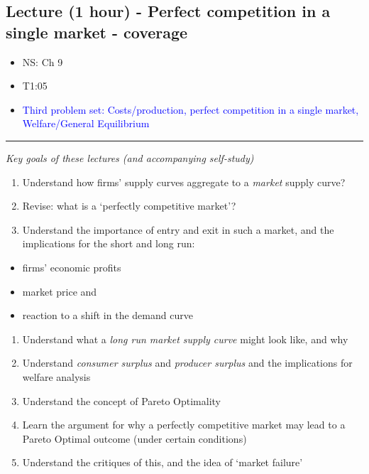 \documentclass[]{article}
\providecommand{\tightlist}{%
  \setlength{\itemsep}{0pt}\setlength{\parskip}{0pt}}
\begin{document}
\hypertarget{lecture-1-hour---perfect-competition-in-a-single-market---coverage}{%
\subsection{Lecture (1 hour) - Perfect competition in a single market -
coverage}\label{lecture-1-hour---perfect-competition-in-a-single-market---coverage}}

\begin{itemize}
\item
  NS: Ch 9
\item
  T1:05
\item
  \textcolor{blue}{Third problem set: Costs/production, perfect competition in a single market, Welfare/General Equilibrium }
\end{itemize}

\begin{center}\rule{0.5\linewidth}{\linethickness}\end{center}

\emph{Key goals of these lectures (and accompanying self-study)}

\begin{enumerate}
\def\labelenumi{\arabic{enumi}.}
\tightlist
\item
  Understand how firms' supply curves aggregate to a \emph{market}
  supply curve?
\item
  Revise: what is a `perfectly competitive market'?
\item
  Understand the importance of entry and exit in such a market, and the
  implications for the short and long run:
\end{enumerate}

\begin{itemize}
\tightlist
\item
  firms' economic profits
\item
  market price and
\item
  reaction to a shift in the demand curve
\end{itemize}

\begin{enumerate}
\def\labelenumi{\arabic{enumi}.}
\tightlist
\item
  Understand what a \emph{long run market supply curve} might look like,
  and why
\item
  Understand \emph{consumer surplus} and \emph{producer surplus} and the
  implications for welfare analysis
\item
  Understand the concept of Pareto Optimality
\item
  Learn the argument for why a perfectly competitive market may lead to
  a Pareto Optimal outcome (under certain conditions)
\item
  Understand the critiques of this, and the idea of `market failure'
\end{enumerate}
\end{document}

